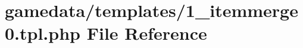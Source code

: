\hypertarget{1__itemmerge0_8tpl_8php}{\section{gamedata/templates/1\+\_\+itemmerge0.tpl.\+php File Reference}
\label{1__itemmerge0_8tpl_8php}
}

